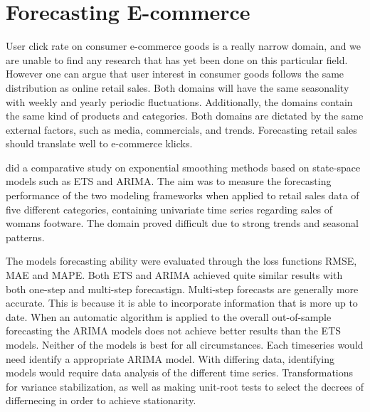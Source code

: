 \section{Forecasting E-commerce}
\label{section:RelatedWork:forecasting-ecommerce}
User click rate on consumer e-commerce goods is a really narrow domain,
and we are unable to find any research that has yet been done on this particular field.
However one can argue that user interest in consumer goods follows the same distribution
as online retail sales.
Both domains will have the same seasonality with weekly and yearly periodic fluctuations.
Additionally, the domains contain the same kind of products and categories.
Both domains are dictated by the same external factors, such as media, commercials, 
and trends.
Forecasting retail sales should translate well to e-commerce klicks.


\cite{Ramos2015} did a comparative study on exponential smoothing methods
based on state-space models such as ETS and ARIMA.
The aim was to measure the forecasting performance of the two modeling frameworks
when applied to retail sales data of five different categories,
containing univariate time series regarding sales of womans footware.
The domain proved difficult due to strong trends and seasonal patterns.

The models forecasting ability were evaluated through the loss functions RMSE, MAE and MAPE.
Both ETS and ARIMA achieved quite similar results with both one-step and multi-step forecastign.
Multi-step forecasts are generally more accurate.
This is because it is able to incorporate information that is more up to date.
When an automatic algorithm is applied to the overall out-of-sample
forecasting the ARIMA models does not achieve better results than the ETS models.
Neither of the models is best for all circumstances.
Each timeseries would need identify a appropriate ARIMA model.
With differing data, identifying models would require data analysis of the different time series.
Transformations for variance stabilization, as well as making unit-root tests to select the decrees of differnecing in order to achieve stationarity.





